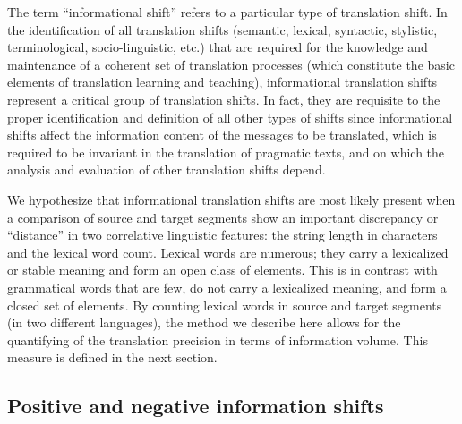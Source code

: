 \documentclass[output=paper]{langsci/langscibook}
\begin{document}
The term \enquote{informational shift} refers to a particular type of translation shift. In the identification of all translation shifts (semantic, lexical, syntactic, stylistic, terminological, socio-linguistic, etc.) that are required for the knowledge and maintenance of a coherent set of translation processes (which constitute the basic elements of translation learning and teaching), informational translation shifts represent a critical group of translation shifts. In fact, they are requisite to the proper identification and definition of all other types of shifts since informational shifts affect the information content of the messages to be translated, which is required to be invariant in the translation of pragmatic texts, and on which the analysis and evaluation of other translation shifts depend.

We hypothesize that informational translation shifts are most likely present when a comparison of source and target segments show an important discrepancy or \enquote{distance} in two correlative linguistic features: the string length in characters and the lexical word count. Lexical words are numerous; they carry a lexicalized or stable meaning and form an open class of elements. This is in contrast with grammatical words that are few, do not carry a lexicalized meaning, and form a closed set of elements. By counting lexical words in source and target segments (in two different languages), the method we describe here allows for the quantifying of the translation precision in terms of information volume. This measure is defined in the next section.

\subsection{Positive and negative information shifts}\label{ep:posneg}
\end{document}
